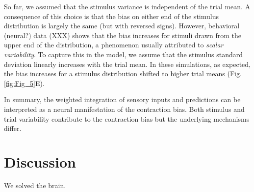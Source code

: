 \documentclass[10pt,a4paper,draft]{article}
\begin{document}
So far, we assumed that the stimulus variance is independent of the trial mean. A consequence of this choice is that the bias on either end of the stimulus distribution is largely the same (but with reversed signs). However, behavioral (neural?) data (XXX) shows that the bias increases for stimuli drawn from the upper end of the distribution, a phenomenon usually attributed to \textit{scalar variability}. To capture this in the model, we assume that the stimulus standard deviation linearly increases with the trial mean. In these simulations, as expected, the bias increases for a stimulus distribution shifted to higher trial means (Fig. \ref{fig:Fig_5}E).

In summary, the weighted integration of sensory inputs and predictions can be interpreted as a neural manifestation of the contraction bias. Both stimulus and trial variability contribute to the contraction bias but the underlying mechanisms differ. 



\section*{Discussion}

We solved the brain.






\end{document}
